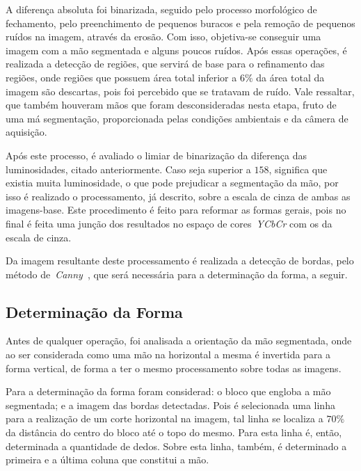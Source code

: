 \documentclass[conference]{Trabalho_Final}
\begin{document}
A diferen\c{c}a absoluta foi binarizada, seguido pelo processo morfol\'ogico de fechamento, pelo preenchimento de pequenos buracos e pela remo\c{c}\~ao de pequenos ru\'idos na imagem, atrav\'es da eros\~ao. Com isso, objetiva-se conseguir uma imagem com a m\~ao segmentada e alguns poucos ru\'idos. Ap\'os essas opera\c{c}\~oes, \'e realizada a detec\c{c}\~ao de regi\~oes, que servir\'a de base para o refinamento das regi\~oes, onde regi\~oes que possuem \'area total inferior a $6\%$ da \'area total da imagem s\~ao descartas, pois foi percebido que se tratavam de ru\'ido. Vale ressaltar, que  tamb\'em houveram m\~aos que foram desconsideradas nesta etapa, fruto de uma m\'a segmenta\c{c}\~ao, proporcionada pelas condi\c{c}\~oes ambientais e da c\^amera de aquisi\c{c}\~ao.

Ap\'os este processo, \'e avaliado o limiar de binariza\c{c}\~ao da diferen\c{c}a das luminosidades, citado anteriormente. Caso seja superior a $158$, significa que existia muita luminosidade, o que pode prejudicar a segmenta\c{c}\~ao da m\~ao, por isso \'e realizado o processamento, j\'a descrito, sobre a escala de cinza de ambas as imagens-base. Este procedimento \'e feito para reformar as formas gerais, pois no final \'e feita uma jun\c{c}\~ao dos resultados no espa\c{c}o de cores~\textit{YCbCr} com os da escala de cinza.

Da imagem resultante deste processamento \'e realizada a detec\c{c}\~ao de bordas, pelo m\'etodo de~\textit{Canny}~\cite{canny}, que ser\'a necess\'aria para a determina\c{c}\~ao da forma, a seguir.

\subsection{Determina\c{c}\~ao da Forma}
  \label{subsec:deterforma1}
Antes de qualquer opera\c{c}\~ao, foi analisada a orienta\c{c}\~ao da m\~ao segmentada, onde ao ser considerada como uma m\~ao na horizontal a mesma \'e invertida para a forma vertical, de forma a ter o mesmo processamento sobre todas as imagens.

Para a determina\c{c}\~ao da forma foram considerad: o bloco que engloba a m\~ao segmentada; e a imagem das bordas detectadas. Pois \'e selecionada uma linha para a realiza\c{c}\~ao de um corte horizontal na imagem, tal linha se localiza a $70\%$ da dist\^ancia do centro do bloco at\'e o topo do mesmo. Para esta linha \'e, ent\~ao, determinada a quantidade de dedos. Sobre esta linha, tamb\'em, \'e determinado a primeira e a \'ultima coluna que constitui a m\~ao.
\end{document}
